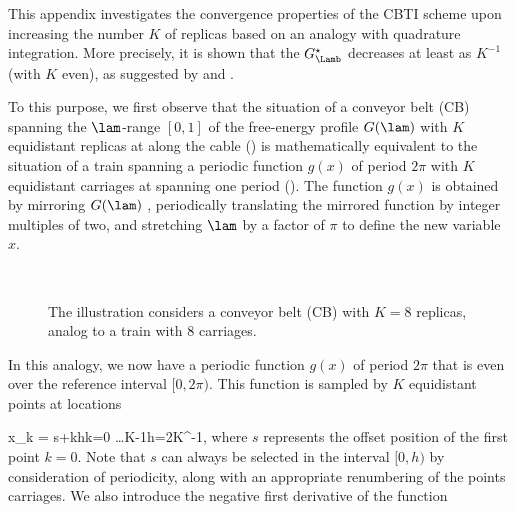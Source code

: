 This appendix investigates the convergence properties of the CBTI scheme upon
increasing the number $K$ of replicas based on an analogy with quadrature integration. More precisely, it is  shown that the 
 $G_{\Lamb}^\star$  decreases at least as $K^{-1}$ 
(with $K$ even), as suggested by  and .


To this purpose, we first observe that the situation of a conveyor belt (CB) spanning the $\lam$-range $[0,1]$ of the free-energy profile $G(\lam)$ with $K$ equidistant replicas at  along the cable () is mathematically equivalent to the situation of a train spanning a periodic function $g(x)$ of period $2\pi$ with $K$ equidistant carriages at  spanning one period ().
%
The function $g(x)$ is obtained by mirroring $G(\lam)$ , periodically translating the mirrored function by integer multiples of two, and stretching $\lam$ by a factor of $\pi$ to define the new variable $x$.

\begin{figure}[H]
  \centering
  \\
  \caption{\footnotesize{}
    The illustration considers a conveyor belt (CB) with $K=8$ replicas, analog
  to a train with 8 carriages.}
  \label{fig:train}
\end{figure}


In this analogy, we now have a periodic function $g(x)$ of period $2\pi$ that is even over the reference interval $[0,2\pi)$.
%
    This function is sampled by $K$ equidistant points at locations

    x_k = s+kh\quad{}\quad k=0 \dots K-1\quad{}\quad h=2\pi K^{-1},
    \eeq
%
    where $s$ represents the offset position of the first point $k=0$.
%
    Note that $s$ can always be selected in the interval $[0,h)$ 
    by consideration of periodicity, along with an appropriate renumbering of the points carriages. 
We also introduce the negative first derivative of the function


